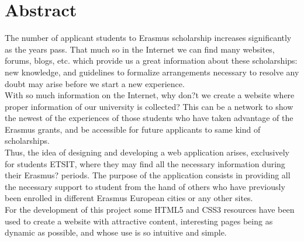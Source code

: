 \chapter{Abstract}
The number of applicant students to Erasmus scholarship increases significantly as the years pass. That much so in the Internet we can find many websites, forums, blogs, etc. which provide us a great information about these scholarships: new knowledge, and guidelines to formalize arrangements necessary to resolve any doubt may arise before we start a new experience.\\

With so much information on the Internet, why don?t we create a website where proper information of our university is collected? This can be a network to show the newest of the experiences of those students who have taken advantage of the Erasmus grants, and be accessible for future applicants to same kind of scholarships.\\

Thus, the idea of designing and developing a web application arises, exclusively for students ETSIT, where they may find all the necessary information during their Erasmus? periods. The purpose of the application consists in providing all the necessary support to student from the hand of others who have previously been enrolled in different Erasmus European cities or any other sites.\\

For the development of this project some HTML5 and CSS3 resources have been used to create a website with attractive content, interesting pages being as dynamic as possible, and whose use is so intuitive and simple.\\
